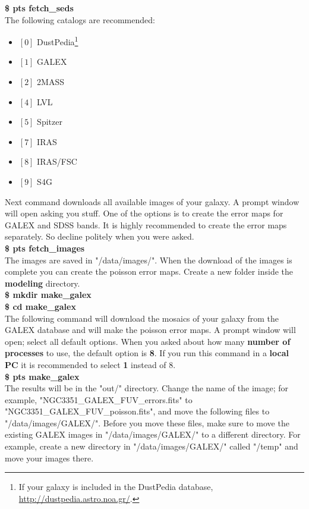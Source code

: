 \documentclass[15pt,a4paper,oneside,openright]{report}
\begin{document}
\textbf{\$ pts fetch\_seds}\\

The following catalogs are recommended:

\begin{itemize}
	\item $\left[0\right]$ DustPedia\footnote{If your galaxy is included in the DustPedia database, 
	\href{http://dustpedia.astro.noa.gr/}{http://dustpedia.astro.noa.gr/}.}
	\item $\left[1\right]$ GALEX
	\item $\left[2\right]$ 2MASS
	\item $\left[4\right]$ LVL
	\item $\left[5\right]$ Spitzer
	\item $\left[7\right]$ IRAS
	\item $\left[8\right]$ IRAS/FSC
	\item $\left[9\right]$ S4G
\end{itemize}

Next command downloads all available images of your galaxy. A prompt window will open asking you stuff. 
One of the options is to create the error maps for GALEX and SDSS bands. It is highly recommended
to create the error maps separately. So decline politely when you were asked.\\

\textbf{\$ pts fetch\_images}\\

The images are saved in "/data/images/". When the download of the images is complete you can create the poisson error maps. 
Create a new folder inside the \textbf{modeling} directory.\\

\textbf{\$ mkdir make\_galex}\\

\textbf{\$ cd make\_galex}\\

The following command will download the mosaics of your galaxy from the GALEX database and will make the 
poisson error maps. A prompt window will open; select all default options. When you asked about how many 
\textbf{number of processes} to use, the default option is \textbf{8}. If you run this command in a \textbf{local PC} it is recommended 
to select \textbf{1} instead of 8.\\

\textbf{\$ pts make\_galex}\\

The results will be in the "out/" directory. Change the name of the image; for example, 
"NGC3351\_GALEX\_FUV\_errors.fits" to "NGC3351\_GALEX\_FUV\_poisson.fits", and move the following files to "/data/images/GALEX/". 
Before you move these files, make sure to move the existing GALEX images in "/data/images/GALEX/" to a different directory. For example, 
create a new directory in "/data/images/GALEX/" called "/temp" and move your images there.
\end{document}

